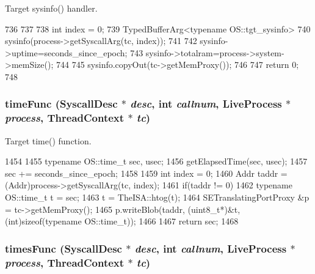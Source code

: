 Target sysinfo() handler. 


\begin{DoxyCode}
736 {
737 
738     int index = 0;
739     TypedBufferArg<typename OS::tgt_sysinfo>
740         sysinfo(process->getSyscallArg(tc, index));   
741 
742     sysinfo->uptime=seconds_since_epoch;
743     sysinfo->totalram=process->system->memSize();
744 
745     sysinfo.copyOut(tc->getMemProxy());
746 
747     return 0;
748 }
\end{DoxyCode}
\hypertarget{syscall__emul_8hh_ac73c74c47ae346b8e74a8d60682c3211}{
\subsubsection[{timeFunc}]{ timeFunc ({\bf SyscallDesc} $\ast$ {\em desc}, \/  int {\em callnum}, \/  {\bf LiveProcess} $\ast$ {\em process}, \/  {\bf ThreadContext} $\ast$ {\em tc})}}
\label{syscall__emul_8hh_ac73c74c47ae346b8e74a8d60682c3211}


Target time() function. 


\begin{DoxyCode}
1454 {
1455     typename OS::time_t sec, usec;
1456     getElapsedTime(sec, usec);
1457     sec += seconds_since_epoch;
1458 
1459     int index = 0;
1460     Addr taddr = (Addr)process->getSyscallArg(tc, index);
1461     if(taddr != 0) {
1462         typename OS::time_t t = sec;
1463         t = TheISA::htog(t);
1464         SETranslatingPortProxy &p = tc->getMemProxy();
1465         p.writeBlob(taddr, (uint8_t*)&t, (int)sizeof(typename OS::time_t));
1466     }
1467     return sec;
1468 }
\end{DoxyCode}
\hypertarget{syscall__emul_8hh_af669a50393a3e59f5d77210b44b8c645}{
\subsubsection[{timesFunc}]{ timesFunc ({\bf SyscallDesc} $\ast$ {\em desc}, \/  int {\em callnum}, \/  {\bf LiveProcess} $\ast$ {\em process}, \/  {\bf ThreadContext} $\ast$ {\em tc})}}
\label{syscall__emul_8hh_af669a50393a3e59f5d77210b44b8c645}


